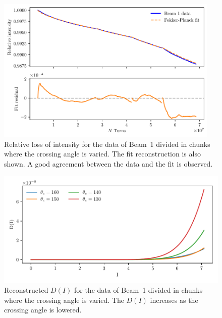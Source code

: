 \begin{figure}[th]
    \centering
    \includegraphics[width=0.95\textwidth]{5_wire_compensators_LHC/figs/losses_b1.pdf}
    \caption{Relative loss of intensity for the data of Beam~1 divided in chunks where the crossing angle is varied. The fit reconstruction is also shown. A good agreement between the data and the fit is observed.}
    \label{fig:reconstruction_1}
\end{figure}
\begin{figure}[th]
    \centering
    \includegraphics[width=\textwidth]{5_wire_compensators_LHC/figs/fokker_planck_b1_D.pdf}
    \caption{Reconstructed $D(I)$ for the data of Beam~1 divided in chunks where the crossing angle is varied. The $D(I)$ increases as the crossing angle is lowered.}
    \label{fig:reconstruction_2}
\end{figure}

